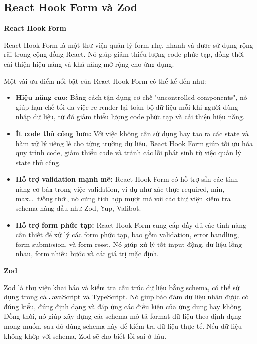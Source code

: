 \subsection{React Hook Form và Zod}

\medskip
\textbf{React Hook Form}
\medskip

React Hook Form là một thư viện quản lý form nhẹ, nhanh và được sử dụng rộng rãi trong cộng đồng React. Nó giúp giảm thiểu lượng code phức tạp, đồng thời cải thiện hiệu năng và khả năng mở rộng cho ứng dụng. 

Một vài ưu điểm nổi bật của React Hook Form có thể kể đến như:

\begin{itemize}
    \item \textbf{Hiệu năng cao:} Bằng cách tận dụng cơ chế "uncontrolled components", nó giúp hạn chế tối đa việc re-render lại toàn bộ dữ liệu mỗi khi người dùng nhập dữ liệu, từ đó giảm thiểu lượng code phức tạp và cải thiện hiệu năng.

    \item \textbf{Ít code thủ công hơn:} Với việc không cần sử dụng hay tạo ra các state và hàm xử lý riêng lẻ cho từng trường dữ liệu, React Hook Form giúp tối ưu hóa quy trình code, giảm thiểu code và tránh các lỗi phát sinh từ việc quản lý state thủ công. 

    \item \textbf{Hỗ trợ validation mạnh mẽ:} React Hook Form có hỗ trợ sẵn các tính năng cơ bản trong việc validation, ví dụ như xác thực required, min, max\ldots\ Đồng thời, nó cũng tích hợp mượt mà với các thư viện kiểm tra schema hàng đầu như Zod, Yup, Valibot.
    
    \item \textbf{Hỗ trợ form phức tạp:} React Hook Form cung cấp đầy đủ các tính năng cần thiết để xử lý các form phức tạp, bao gồm validation, error handling, form submission, và form reset. Nó giúp xử lý tốt input động, dữ liệu lồng nhau, form nhiều bước và các giá trị mặc định.
\end{itemize}

\medskip
\textbf{Zod}
\medskip

Zod là thư viện khai báo và kiểm tra cấu trúc dữ liệu bằng schema, có thể sử dụng trong cả JavaScript và TypeScript. Nó giúp bảo đảm dữ liệu nhận được có đúng kiểu, đúng định dạng và đáp ứng các điều kiện của ứng dụng hay không. Đồng thời, nó giúp xây dựng các schema mô tả format dữ liệu theo định dạng mong muốn, sau đó dùng schema này để kiểm tra dữ liệu thực tế. Nếu dữ liệu không khớp với schema, Zod sẽ cho biết lỗi sai ở đâu.


